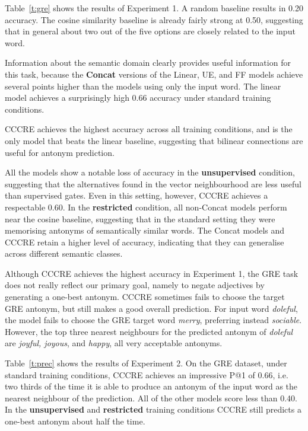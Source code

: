 \documentclass[11pt]{article}
\begin{document}
Table~\ref{t:gre} shows the results of Experiment 1. A random baseline results in 0.20 accuracy. The cosine similarity baseline is already fairly strong at 0.50, suggesting that in general about two out of the five options are closely related to the input word.

Information about the semantic domain clearly provides useful information for this task, because the {\bf Concat} versions of the Linear, UE, and FF models achieve several points higher than the models using only the input word. The linear model achieves a surprisingly high 0.66 accuracy under standard training conditions.

CCCRE achieves the highest accuracy across all training conditions, and is the only model that beats the linear baseline, suggesting that bilinear connections are useful for antonym prediction.

All the models show a notable loss of accuracy in the {\bf unsupervised} condition,
suggesting that 
the alternatives found in the vector neighbourhood are less useful than supervised gates.
Even in this setting, however, CCCRE achieves a respectable 0.60.
In the {\bf restricted} condition, 
all non-Concat models perform near the cosine baseline, suggesting that in the standard setting they were memorising antonyms of semantically similar words. The Concat models and CCCRE retain a higher level of accuracy, indicating that they can generalise across different semantic classes.

Although CCCRE achieves the highest accuracy in Experiment 1, the GRE task does not really reflect our primary goal, namely to negate adjectives by generating a one-best antonym. CCCRE sometimes fails to choose the target GRE antonym, but still makes a good overall prediction. For input word {\it doleful}, the model fails to choose the GRE target word {\it merry}, preferring instead {\it sociable}. However, the top three nearest neighbours for the predicted antonym of {\it doleful} are {\it joyful, joyous}, and {\it happy}, all very acceptable antonyms. 

Table~\ref{t:prec} shows the results of Experiment 2. On the GRE dataset, under standard training conditions, CCCRE achieves an impressive P@1 of 0.66, i.e. two thirds of the time it is able to produce an antonym of the input word as the nearest neighbour of the prediction. All of the other models score less than 0.40. In the {\bf unsupervised} and {\bf restricted} training conditions CCCRE 
still predicts a one-best antonym about half the time.
\end{document}

